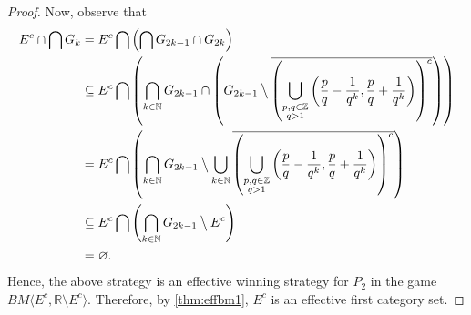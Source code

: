 \documentclass[a4paper,UKenglish,autoref,thm-restate,numberwithinsect]{lipics-v2021}
\newcommand{\N}{\mathbb{N}}
\begin{document}
\begin{proof}
Now, observe that
\begin{align*}
  E^c\cap\bigcap G_k&=E^c\bigcap\left(\bigcap G_{2k-1}\cap G_{2k}\right)\\
                    &\subseteq E^c\bigcap\left(\bigcap_{k\in\N}G_{2k-1}\cap\left(G_{2k-1}\mathbin{\big\backslash}\overline{\left(\bigcup_{\substack{p,q\in\mathbb{Z}\\q>1}}\left(\frac{p}{q}-\frac{1}{q^k},\frac{p}{q}+\frac{1}{q^k}\right)\right)^c}\right)\right)\\
                    &=E^c\bigcap\left(\bigcap_{k\in\N}G_{2k-1}\mathbin{\big\backslash}\bigcup_{k\in\N}\overline{\left(\bigcup_{\substack{p,q\in\mathbb{Z}\\q>1}}\left(\frac{p}{q}-\frac{1}{q^k},\frac{p}{q}+\frac{1}{q^k}\right)\right)^c}\right)\\
                    &\subseteq E^c\bigcap\left(\bigcap_{k\in\N}G_{2k-1}\mathbin{\big\backslash}E^c\right)\\
                    &=\varnothing.
\end{align*}
Hence, the above strategy is an effective winning strategy for $P_2$
in the game $BM\langle E^c,\mathbb{R}\setminus E^c\rangle$. Therefore,
by \cref{thm:effbm1}, $E^c$ is an effective first category set.
\end{proof}




\end{document}
